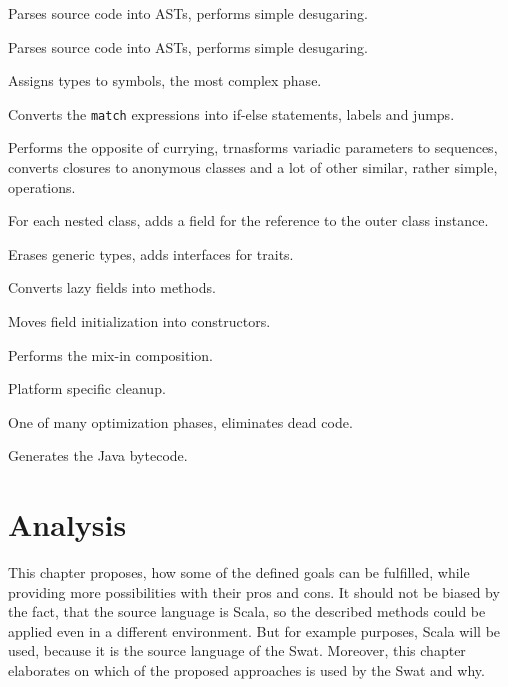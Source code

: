 \documentclass[12pt,a4paper]{report}
\begin{document}
\begin{description}[style=multiline,leftmargin=5cm]
\item[\texttt{syntaxAnalyzer}] Parses source code into ASTs, performs simple desugaring.
\item[\texttt{analyzer.namerFactory}] Parses source code into ASTs, performs simple desugaring.
\item[\texttt{analyzer.typerFactory}] Assigns types to symbols, the most complex phase.
\item[\texttt{patmat}] Converts the \texttt{match} expressions into if-else statements, labels and jumps.
\item[\texttt{uncurry}] Performs the opposite of currying, trnasforms variadic parameters to sequences, converts closures to anonymous classes and a lot of other similar, rather simple, operations. 
\item[\texttt{explicitOuter}] For each nested class, adds a field for the reference to the outer class instance. 
\item[\texttt{erasure}] Erases generic types, adds interfaces for traits.
\item[\texttt{lazyVals}] Converts lazy fields into methods.
\item[\texttt{constructors}] Moves field initialization into constructors.
\item[\texttt{mixer}] Performs the mix-in composition.
\item[\texttt{cleanup}] Platform specific cleanup.
\item[\texttt{deadCode}] One of many optimization phases, eliminates dead code.
\item[\texttt{jvm}] Generates the Java bytecode.
\end{description}



\chapter{Analysis}

This chapter proposes, how some of the defined goals can be fulfilled, while providing more possibilities with their pros and cons. It should not be biased by the fact, that the source language is Scala, so the described methods could be applied even in a different environment. But for example purposes, Scala will be used, because it is the source language of the Swat. Moreover, this chapter elaborates on which of the proposed approaches is used by the Swat and why.
\end{document}

